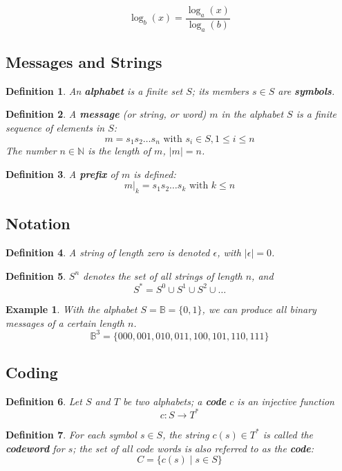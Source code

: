 \documentclass[11pt]{article}
\newtheorem{defn}{Definition}
\newtheorem{eg}{Example}
\begin{document}
\[ \log_{b} (x) = \frac{\log_{a} (x)}{\log_{a} (b)} \]

\subsection{Messages and Strings}
\begin{defn}
  An \textbf{alphabet} is a finite set $S$; its members $s \in S$ are \textbf{symbols}.
\end{defn}

\begin{defn}
  A \textbf{message} (or string, or word) $m$ in the alphabet $S$ is a finite sequence of elements in $S$:
  \[ m = s_1 s_2 \ldots s_n \text{ with } s_i \in S, 1 \leq i \leq n \]
  The number $n \in \mathbb{N}$ is the length of $m$, $\lvert m \rvert = n$.
\end{defn}

\begin{defn}
  A \textbf{prefix} of $m$ is defined:
  \[ m \rvert_{k} = s_1 s_2 \ldots s_k \text{ with } k \leq n \]
\end{defn}

\subsection{Notation}
\begin{defn}
  A string of length zero is denoted $\epsilon$, with $\lvert \epsilon \rvert = 0$.
\end{defn}

\begin{defn}
  $S^n$ denotes the set of all strings of length $n$, and
  \[ S^* = S^0 \cup S^1 \cup S^2 \cup \ldots \]
\end{defn}

\begin{eg}
  With the alphabet $S = \mathbb{B} = \{ 0, 1 \}$, we can produce all binary messages of a certain length $n$.
  \[ \mathbb{B}^3 = \{ 000, 001, 010, 011, 100, 101, 110, 111 \} \]
\end{eg}

\subsection{Coding}
\begin{defn}
  Let $S$ and $T$ be two alphabets; a \textbf{code} $c$ is an injective function
  \[ c : S \rightarrow T^* \]
\end{defn}

\begin{defn}
  For each symbol $s \in S$, the string $ c(s) \in T^*$ is called the \textbf{codeword} for $s$; the set of all code words is also referred to as the \textbf{code}:
  \[ C = \{ c(s) \mid s \in S \} \]
\end{defn}
\end{document}
